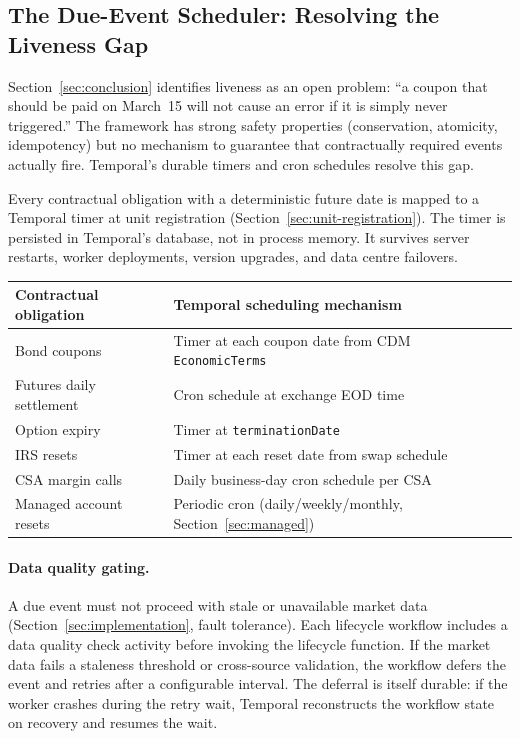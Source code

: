 \documentclass[11pt,a4paper]{article}
\begin{document}
\subsection{The Due-Event Scheduler: Resolving the Liveness Gap}
\label{sec:temporal-scheduler}

Section~\ref{sec:conclusion} identifies liveness as an open problem: ``a coupon that should be paid on March~15 will not cause an error if it is simply never triggered.'' The framework has strong safety properties (conservation, atomicity, idempotency) but no mechanism to guarantee that contractually required events actually fire. Temporal's durable timers and cron schedules resolve this gap.

Every contractual obligation with a deterministic future date is mapped to a Temporal timer at unit registration (Section~\ref{sec:unit-registration}). The timer is persisted in Temporal's database, not in process memory. It survives server restarts, worker deployments, version upgrades, and data centre failovers.

\begin{center}
\small
\begin{tabular}{l l}
\toprule
\textbf{Contractual obligation} & \textbf{Temporal scheduling mechanism} \\
\midrule
Bond coupons & Timer at each coupon date from CDM \texttt{EconomicTerms} \\
Futures daily settlement & Cron schedule at exchange EOD time \\
Option expiry & Timer at \texttt{terminationDate} \\
IRS resets & Timer at each reset date from swap schedule \\
CSA margin calls & Daily business-day cron schedule per CSA \\
Managed account resets & Periodic cron (daily/weekly/monthly, Section~\ref{sec:managed}) \\
\bottomrule
\end{tabular}
\end{center}

\paragraph{Data quality gating.}
A due event must not proceed with stale or unavailable market data (Section~\ref{sec:implementation}, fault tolerance). Each lifecycle workflow includes a data quality check activity before invoking the lifecycle function. If the market data fails a staleness threshold or cross-source validation, the workflow defers the event and retries after a configurable interval. The deferral is itself durable: if the worker crashes during the retry wait, Temporal reconstructs the workflow state on recovery and resumes the wait.
\end{document}
